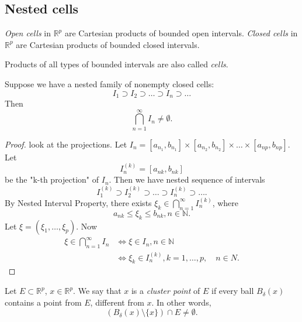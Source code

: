 
\subsection{Nested cells}

\begin{definition}
	\textit{Open cells} in $\mathbb{R}^p$ are Cartesian products of bounded open intervals.
	\textit{Closed cells} in $\mathbb{R}^p$ are Cartesian products of bounded closed intervals.

	Products of all types of bounded intervals are also called \textit{cells}.
\end{definition}

\begin{theorem}
	Suppose we have a nested family of nonempty closed cells: \[
		I_1 \supset I_2 \supset \ldots\supset I_n \supset \ldots
	\] 
	Then \[
		\bigcap_{n = 1} ^{\infty } I_n \neq  \emptyset 
	.\] 
\end{theorem}
\begin{proof}
	look at the projections.
	Let $I_n = [a_{n_1}, b_{n_1}] \times [a_{n_2},b_{n_2}] \times  \ldots \times [a_{np },b_{np }]$. 
	Let \[
		I_n^{(k)} = [a_{nk }, b_{nk }]
	\] be the "k-th projection" of $I_n$. 
	Then we have nested sequence of intervals \[
		I_1^{(k)}\supset I_2^{(k)} \supset \ldots\supset I_n^{(k)} \supset \ldots
	.\] 
	By Nested Interval Property, there exists $\xi_k \in \bigcap_{n = 1} ^\infty I_n^{(k)}$, where \[
		a_{nk} \le \xi_k \le b_{nk}, n \in \mathbb{N}
	.\] 
	Let $\xi = (\xi_1, \ldots, \xi_p)$.
	Now
	\begin{align*}
		\xi \in \bigcap_{n=1} ^\infty  I_n &\iff \xi \in I_n, n \in \mathbb{N} \\
	&\iff \xi_k \in I_n^{(k)}, k = 1,\ldots,p, \quad n \in N.
	\end{align*}
\end{proof}

\begin{definition}
	Let $E \subset \mathbb{R}^p$, $x \in \mathbb{R}^p$. We say that $x$ is a \textit{cluster point} of $E$ if every ball $B_\delta(x)$ contains a point from $E$, different from $x$. In other words, \[
		(B_{\delta}(x) \setminus \{x\} ) \cap E \neq \emptyset 
	.\] 
\end{definition}

